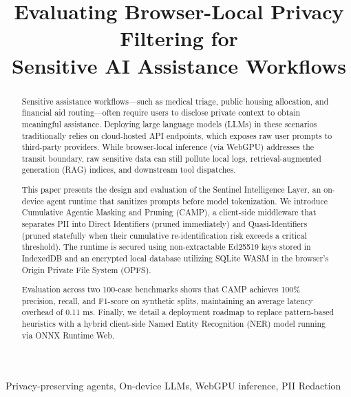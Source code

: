 \documentclass[conference]{IEEEtran}
\begin{document}
\title{Evaluating Browser-Local Privacy Filtering for\\Sensitive AI Assistance Workflows}

\author{
}

\maketitle

\begin{abstract}
Sensitive assistance workflows—such as medical triage, public housing allocation, and financial aid routing—often require users to disclose private context to obtain meaningful assistance. Deploying large language models (LLMs) in these scenarios traditionally relies on cloud-hosted API endpoints, which exposes raw user prompts to third-party providers. While browser-local inference (via WebGPU) addresses the transit boundary, raw sensitive data can still pollute local logs, retrieval-augmented generation (RAG) indices, and downstream tool dispatches. 

This paper presents the design and evaluation of the Sentinel Intelligence Layer, an on-device agent runtime that sanitizes prompts before model tokenization. We introduce Cumulative Agentic Masking and Pruning (CAMP), a client-side middleware that separates PII into Direct Identifiers (pruned immediately) and Quasi-Identifiers (pruned statefully when their cumulative re-identification risk exceeds a critical threshold). The runtime is secured using non-extractable Ed25519 keys stored in IndexedDB and an encrypted local database utilizing SQLite WASM in the browser's Origin Private File System (OPFS). 

Evaluation across two 100-case benchmarks shows that CAMP achieves 100\% precision, recall, and F1-score on synthetic splits, maintaining an average latency overhead of 0.11 ms. Finally, we detail a deployment roadmap to replace pattern-based heuristics with a hybrid client-side Named Entity Recognition (NER) model running via ONNX Runtime Web.
\end{abstract}

\begin{IEEEkeywords}
Privacy-preserving agents, On-device LLMs, WebGPU inference, PII Redaction
\end{IEEEkeywords}
\end{document}
